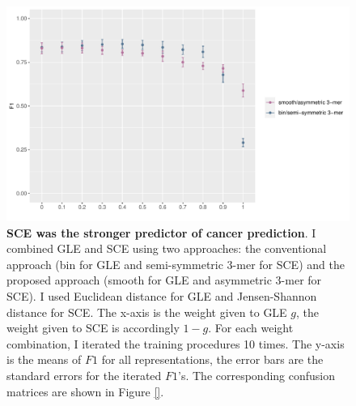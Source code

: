\begin{figure}[h!]
    \includegraphics[scale=0.8]{graphics/f1_combined.pdf}
    \caption{\textbf{SCE was the stronger predictor of cancer prediction}. I combined GLE and SCE using two approaches: the conventional approach (bin for GLE and semi-symmetric 3-mer for SCE) and the proposed approach (smooth for GLE and asymmetric 3-mer for SCE). I used Euclidean distance for GLE and Jensen-Shannon distance for SCE. The x-axis is the weight given to GLE $g$, the weight given to SCE is accordingly $1-g$. For each weight combination, I iterated the training procedures 10 times. The y-axis is the means of $F1$ for all representations, the error bars are the standard errors for the iterated $F1$'s. The corresponding confusion matrices are shown in Figure \ref{}.}
    \label{fig:f1_combined}
\end{figure}
